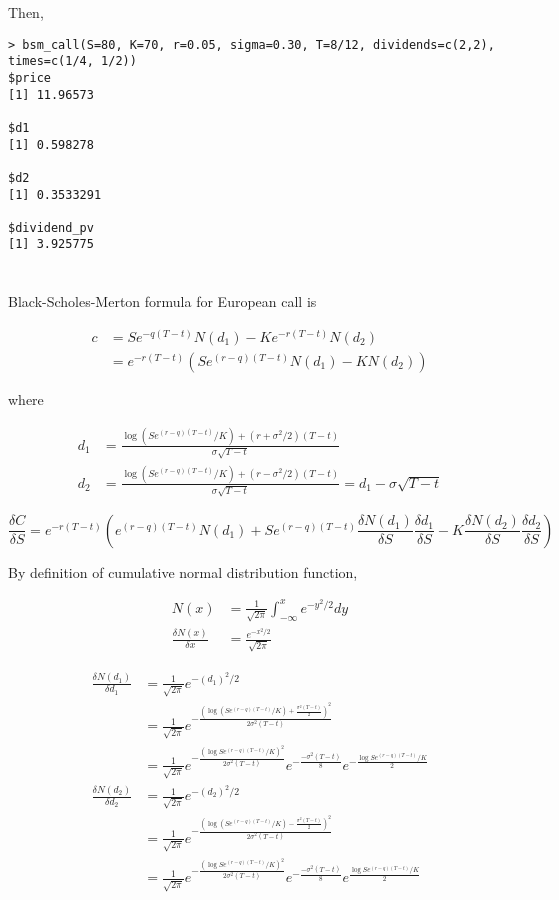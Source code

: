 \documentclass[11pt]{scrartcl}
\newcommand{\defrac}[2]{\ensuremath{\frac{\delta #1}{\delta #2}}}
\renewcommand{\sf}{\ensuremath{Se^{(r-q)(T-t)}}}
\begin{document}
Then,

\begin{lstlisting}
> bsm_call(S=80, K=70, r=0.05, sigma=0.30, T=8/12, dividends=c(2,2), times=c(1/4, 1/2))
$price
[1] 11.96573

$d1
[1] 0.598278

$d2
[1] 0.3533291

$dividend_pv
[1] 3.925775
\end{lstlisting}

\section{}

Black-Scholes-Merton formula for European call is

\begin{align*}
c &= Se^{-q(T-t)}N(d_1) - Ke^{-r(T-t)}N(d_2) \\
&= e^{-r(T-t)}\left(Se^{(r-q)(T-t)}N(d_1) - KN(d_2) \right)
\end{align*}

where

\begin{align*}
d_1 &= \frac{\log{(Se^{(r-q)(T-t)} / K)} + (r+\sigma^2/2)(T-t)}{\sigma\sqrt{T-t}} \\
d_2 &= \frac{\log{(Se^{(r-q)(T-t)} / K)} + (r-\sigma^2/2)(T-t)}{\sigma\sqrt{T-t}} = d_1 - \sigma\sqrt{T-t}
\end{align*}

\[\defrac{C}{S} = e^{-r(T-t)}\left(e^{(r-q)(T-t)}N(d_1) + Se^{(r-q)(T-t)}\defrac{N(d_1)}{S}\defrac{d_1}{S} - K\defrac{N(d_2)}{S}\defrac{d_2}{S} \right)\]


By definition of cumulative normal distribution function,

\begin{align*}
N(x) &= \frac{1}{\sqrt{2\pi}}\int_{-\infty}^x e^{-y^2/2} dy \\
\defrac{N(x)}{x} &= \frac{e^{-x^2/2}}{\sqrt{2\pi}}
\end{align*}

\begin{align*}
\defrac{N(d_1)}{d_1} &= \frac{1}{\sqrt{2\pi}}e^{-(d_1)^2/2} \\
&= \frac{1}{\sqrt{2\pi}}e^{-\frac{(\log{(\sf/K)} + \frac{\sigma^2(T-t)}{2})^2}{2\sigma^2(T-t)}} \\
&= \frac{1}{\sqrt{2\pi}}e^{-\frac{(\log{\sf/K})^2}{2\sigma^2(T-t)}}e^{-\frac{-\sigma^2(T-t)}{8}} e^{-\frac{\log{\sf/K}}{2}} \\
\defrac{N(d_2)}{d_2} &= \frac{1}{\sqrt{2\pi}}e^{-(d_2)^2/2} \\
&= \frac{1}{\sqrt{2\pi}}e^{-\frac{(\log{(\sf/K)} - \frac{\sigma^2(T-t)}{2})^2}{2\sigma^2(T-t)}} \\
&= \frac{1}{\sqrt{2\pi}}e^{-\frac{(\log{\sf/K})^2}{2\sigma^2(T-t)}}e^{-\frac{-\sigma^2(T-t)}{8}} e^{\frac{\log{\sf/K}}{2}} \\
\end{align*}
\end{document}
